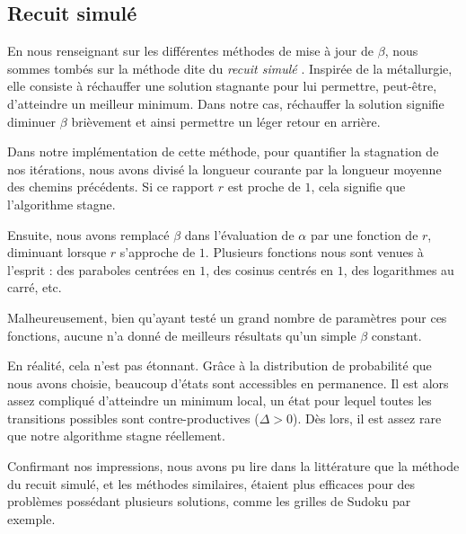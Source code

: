 \documentclass[a4paper, 12pt]{report}
\begin{document}
	\subsection{Recuit simulé}
	En nous renseignant sur les différentes méthodes de mise à jour de $\beta$, nous sommes tombés sur la méthode dite du \textit{recuit simulé} \cite{yang2014nature}. Inspirée de la métallurgie, elle consiste à \og{}réchauffer\fg{} une solution stagnante pour lui permettre, peut-être, d'atteindre un meilleur minimum. Dans notre cas, réchauffer la solution signifie diminuer $\beta$ brièvement et ainsi permettre un léger \og{}retour en arrière\fg{}. \par
	Dans notre implémentation de cette méthode, pour quantifier la stagnation de nos itérations, nous avons divisé la longueur courante par la longueur moyenne des chemins précédents. Si ce rapport $r$ est proche de $1$, cela signifie que l'algorithme stagne. \par 
	Ensuite, nous avons remplacé $\beta$ dans l'évaluation de $\alpha$ par une fonction de $r$, diminuant lorsque $r$ s'approche de $1$. Plusieurs fonctions nous sont venues à l'esprit : des paraboles centrées en $1$, des cosinus centrés en $1$, des logarithmes au carré, etc. \par
	Malheureusement, bien qu'ayant testé un grand nombre de paramètres pour ces fonctions, aucune n'a donné de meilleurs résultats qu'un simple $\beta$ constant. \par
	En réalité, cela n'est pas étonnant. Grâce à la distribution de probabilité que nous avons choisie, beaucoup d'états sont accessibles en permanence. Il est alors assez compliqué d'atteindre un minimum local, \cad{} un état pour lequel toutes les transitions possibles sont contre-productives ($\Delta > 0$). Dès lors, il est assez rare que notre algorithme stagne réellement. \par
	Confirmant nos impressions, nous avons pu lire dans la littérature que la méthode du recuit simulé, et les méthodes similaires, étaient plus efficaces pour des problèmes possédant plusieurs solutions, comme les grilles de Sudoku par exemple.
\end{document}
